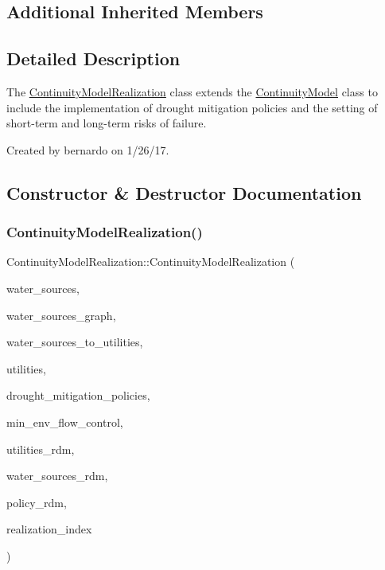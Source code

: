 \subsection*{Additional Inherited Members}


\subsection{Detailed Description}
The \mbox{\hyperlink{classContinuityModelRealization}{Continuity\+Model\+Realization}} class extends the \mbox{\hyperlink{classContinuityModel}{Continuity\+Model}} class to include the implementation of drought mitigation policies and the setting of short-\/term and long-\/term risks of failure.

Created by bernardo on 1/26/17. 

\subsection{Constructor \& Destructor Documentation}
\mbox{\label{classContinuityModelRealization_a641c096ac73586597b3e21a5d516c923}} 
\subsubsection{\texorpdfstring{Continuity\+Model\+Realization()}{ContinuityModelRealization()}}
{\footnotesize\ttfamily Continuity\+Model\+Realization\+::\+Continuity\+Model\+Realization (\begin{DoxyParamCaption}\item[{vector$<$ \mbox{\hyperlink{classWaterSource}{Water\+Source}} $\ast$$>$ \&}]{water\+\_\+sources,  }\item[{const Graph \&}]{water\+\_\+sources\+\_\+graph,  }\item[{const vector$<$ vector$<$ int $>$$>$ \&}]{water\+\_\+sources\+\_\+to\+\_\+utilities,  }\item[{vector$<$ \mbox{\hyperlink{classUtility}{Utility}} $\ast$$>$ \&}]{utilities,  }\item[{const vector$<$ Drought\+Mitigation\+Policy $\ast$$>$ \&}]{drought\+\_\+mitigation\+\_\+policies,  }\item[{vector$<$ Min\+Env\+Flow\+Control $\ast$$>$ \&}]{min\+\_\+env\+\_\+flow\+\_\+control,  }\item[{vector$<$ double $>$ \&}]{utilities\+\_\+rdm,  }\item[{vector$<$ double $>$ \&}]{water\+\_\+sources\+\_\+rdm,  }\item[{vector$<$ double $>$ \&}]{policy\+\_\+rdm,  }\item[{const unsigned int}]{realization\+\_\+index }\end{DoxyParamCaption})}



